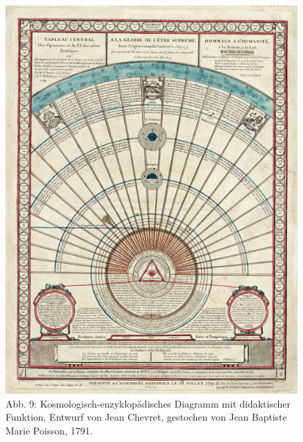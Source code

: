 \begin{figure}[htbp]
\centering
\includegraphics{img/wagner-9.jpg}
\caption*{Abb. 9: Kosmologisch-enzyklopädisches Diagramm mit didaktischer
Funktion, Entwurf von Jean Chevret, gestochen von Jean Baptiste Marie
Poisson, 1791.}
\end{figure}

